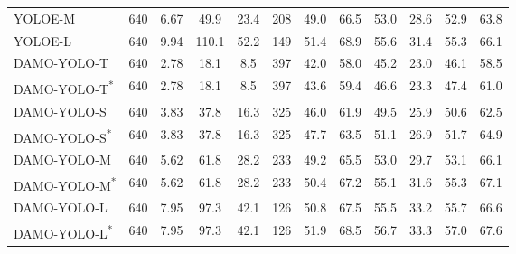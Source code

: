 \documentclass[10pt,twocolumn,letterpaper]{article}
\begin{document}
\begin{table*}[t!]
\begin{center}
\begin{tabular}{l|c|c|c|c|c|c|  c  c c c c}
    YOLOE-M      & 640 & 6.67 & 49.9 & 23.4 & 208 & 49.0 & 66.5 & 53.0 & 28.6 & 52.9 & 63.8    \\
    YOLOE-L      & 640 & 9.94 & 110.1 & 52.2 & 149 & 51.4 & 68.9 & 55.6 & 31.4 & 55.3 & 66.1    \\
    \midrule 
    DAMO-YOLO-T    & 640 & 2.78 & 18.1 & 8.5 & 397 & 42.0 & 58.0 & 45.2 & 23.0 & 46.1 & 58.5 \\
    DAMO-YOLO-T\textsuperscript{*} & 640 & 2.78 & 18.1 & 8.5 & 397 & 43.6 & 59.4 & 46.6 & 23.3 & 47.4 & 61.0   \\
    DAMO-YOLO-S    & 640 & 3.83 & 37.8 & 16.3 & 325 & 46.0 & 61.9 & 49.5 & 25.9 & 50.6 & 62.5   \\
    DAMO-YOLO-S\textsuperscript{*} & 640 & 3.83 & 37.8 & 16.3 & 325 & 47.7 & 63.5 & 51.1 & 26.9 & 51.7 & 64.9   \\
    DAMO-YOLO-M    & 640 & 5.62 & 61.8 & 28.2 & 233 & 49.2 & 65.5 & 53.0 & 29.7 & 53.1 & 66.1   \\
DAMO-YOLO-M\textsuperscript{*} & 640 & 5.62 & 61.8 & 28.2 & 233 & 50.4 & 67.2 & 55.1 & 31.6 & 55.3 & 67.1  \\
    DAMO-YOLO-L & 640 & 7.95 & 97.3 & 42.1 & 126 & 50.8 & 67.5 & 55.5 & 33.2 & 55.7 & 66.6   \\
    DAMO-YOLO-L\textsuperscript{*} & 640 & 7.95 & 97.3 & 42.1 & 126  & 51.9 & 68.5 & 56.7 & 33.3 & 57.0 & 67.6  \\
    \bottomrule
    \end{tabular}
\end{center}
\end{table*}
\end{document}
